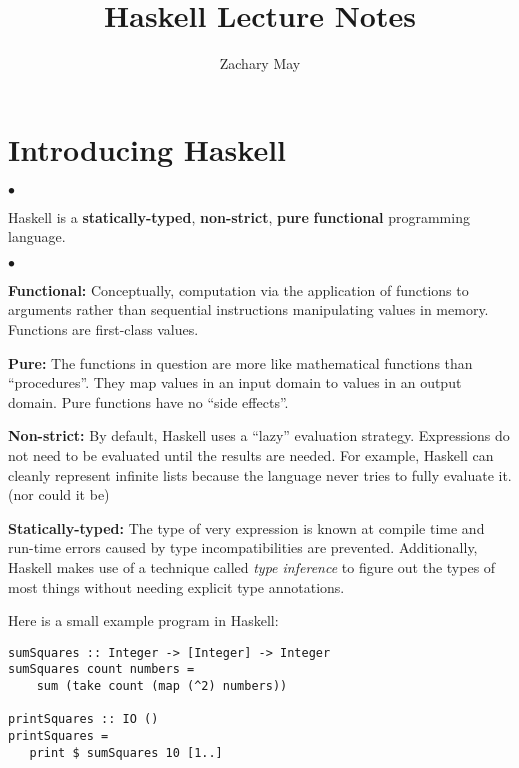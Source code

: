 \documentclass[12pt]{article}
\author{Zachary May}
\title{Haskell Lecture Notes}
\newcommand\note[1]{\raggedright\fbox{#1}}
\newenvironment{notelist}{\begin{list}
   {$\bullet$}
   {\setlength{\itemsep}{0in}}}
   {\end{list}}
\begin{document}
\maketitle

\section{Introducing Haskell}
\begin{notelist}
\item Haskell is a \textbf{statically-typed}, \textbf{non-strict}, \textbf{pure} \textbf{functional}
      programming language.
	\begin{notelist}
	\item \textbf{Functional:} Conceptually, computation via the application of functions to arguments rather than sequential instructions
          manipulating values in memory. Functions are first-class values.
	\item \textbf{Pure:} The functions in question are more like mathematical functions than ``procedures''. They map values in an input domain
          to values in an output domain. Pure functions have no ``side effects''.
	\item \textbf{Non-strict:} By default, Haskell uses a ``lazy'' evaluation strategy. Expressions do not need to be evaluated until the 
          results are needed. For example, Haskell can cleanly represent infinite lists because the language never tries to fully evaluate it.
          (nor could it be)
    \item \textbf{Statically-typed:} The type of very expression is known at compile time and run-time errors caused by type incompatibilities 
          are prevented. Additionally, Haskell makes use of a technique called \textit{type inference} to figure out the types of most things
          without needing explicit type annotations.
	\end{notelist}
\item Here is a small example program in Haskell:
\begin{lstlisting}
sumSquares :: Integer -> [Integer] -> Integer
sumSquares count numbers =
    sum (take count (map (^2) numbers))

printSquares :: IO ()
printSquares =
   print $ sumSquares 10 [1..]
\end{lstlisting}


\end{notelist}
\end{document}
